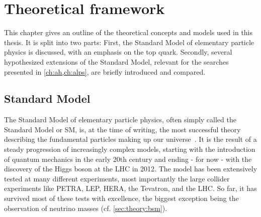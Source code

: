 \chapter{Theoretical framework}
\label{ch:theory}

This chapter gives an outline of the theoretical concepts and models used in this thesis. It is split into two parts: First, the Standard Model of elementary particle physics is discussed, with an emphasis on the top quark. Secondly, several hypothesized extensions of the Standard Model, relevant for the searches presented in \cref{ch:ah,ch:alps}, are briefly introduced and compared.

\section{Standard Model}


The Standard Model of elementary particle physics, often simply called the Standard Model or SM, is, at the time of writing, the most successful theory describing the fundamental particles making up our universe~\cite{Martin:2008zz,Schwartz:2014sze}. It is the result of a steady progression of increasingly complex models, starting with the introduction of quantum mechanics in the early 20th century and ending - for now - with the discovery of the Higgs boson at the LHC in 2012. The model has been extensively tested at many different experiments, most importantly the large collider experiments like PETRA, LEP, HERA, the Tevatron, and the LHC. So far, it has survived most of these tests with excellence, the biggest exception being the observation of neutrino masses (cf. \cref{sec:theory:bsm}).

